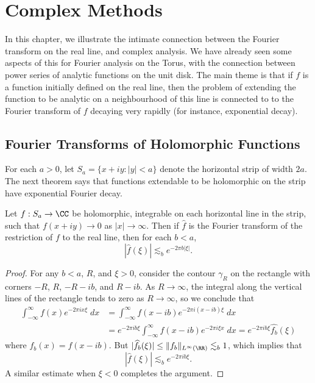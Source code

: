 \chapter{Complex Methods}

In this chapter, we illustrate the intimate connection between the Fourier transform on the real line, and complex analysis. We have already seen some aspects of this for Fourier analysis on the Torus, with the connection between power series of analytic functions on the unit disk. The main theme is that if $f$ is a function initially defined on the real line, then the problem of extending the function to be analytic on a neighbourhood of this line is connected to to the Fourier transform of $f$ decaying very rapidly (for instance, exponential decay).

\section{Fourier Transforms of Holomorphic Functions}

For each $a > 0$, let $S_a = \{ x + iy: |y| < a \}$ denote the horizontal strip of width $2a$. The next theorem says that functions extendable to be holomorphic on the strip have exponential Fourier decay.

\begin{theorem}
    Let $f: S_a \to \CC$ be holomorphic, integrable on each horizontal line in the strip, such that $f(x + iy) \to 0$ as $|x| \to \infty$. Then if $\widehat{f}$ is the Fourier transform of the restriction of $f$ to the real line, then for each $b < a$,
    \[ |\widehat{f}(\xi)| \lesssim_b e^{-2 \pi b |\xi|}. \]
\end{theorem}
\begin{proof}
    For any $b < a$, $R$, and $\xi > 0$, consider the contour $\gamma_R$ on the rectangle with corners $-R$, $R$, $-R-ib$, and $R-ib$. As $R \to \infty$, the integral along the vertical lines of the rectangle tends to zero as $R \to \infty$, so we conclude that
    \begin{align*}
        \int_{-\infty}^\infty f(x)e^{-2\pi i x \xi}\; dx &= \int_{-\infty}^\infty f(x-ib)e^{- 2 \pi i (x - ib) \xi}\; dx\\
        &= e^{-2 \pi i b \xi} \int_{-\infty}^\infty f(x-ib) e^{- 2 \pi i \xi x}\; dx = e^{-2 \pi i b \xi} \widehat{f_b}(\xi)
    \end{align*}
    where $f_b(x) = f(x - ib)$. But $|\widehat{f_b}(\xi)| \leq \| f_b \|_{L^\infty(\RR)} \lesssim_b 1$, which implies that
    \[ |\widehat{f}(\xi)| \lesssim_b e^{-2 \pi i b \xi}. \]
    A similar estimate when $\xi < 0$ completes the argument.
\end{proof}

